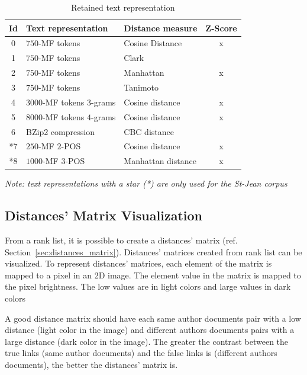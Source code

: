 \begin{table}
  \centering
  \caption{Retained text representation}
  \label{tab:9rl}
  \begin{tabular}{c l l c}
    \toprule
    Id &
    Text representation &
    Distance measure &
    Z-Score \\
    \midrule
    0 & $750$-MF tokens & Cosine Distance & x\\
    1 & $750$-MF tokens & Clark & \\
    2 & $750$-MF tokens & Manhattan & x\\
    3 & $750$-MF tokens & Tanimoto & \\
    4 & $3000$-MF tokens $3$-grams & Cosine distance & x\\
    5 & $8000$-MF tokens $4$-grams & Cosine distance & x\\
    6 & BZip2 compression & CBC distance & \\
    *7 & $250$-MF $2$-POS & Cosine distance & x\\
    *8 & $1000$-MF $3$-POS & Manhattan distance & x\\
    \bottomrule
  \end{tabular}

  \vspace{0.2cm}

  \textit{Note: text representations with a star (*) are only used for the St-Jean corpus}
\end{table}

\subsection{Distances' Matrix Visualization}

From a rank list, it is possible to create a distances' matrix (ref. Section~\ref{sec:distances_matrix}).
Distances' matrices created from rank list can be visualized.
To represent distances' matrices, each element of the matrix is mapped to a pixel in an 2D image.
The element value in the matrix is mapped to the pixel brightness.
The low values are in light colors and large values in dark colors

A good distance matrix should have each same author documents pair with a low distance (light color in the image) and different authors documents pairs with a large distance (dark color in the image).
The greater the contrast between the true links (same author documents) and the false links is (different authors documents), the better the distances' matrix is.

